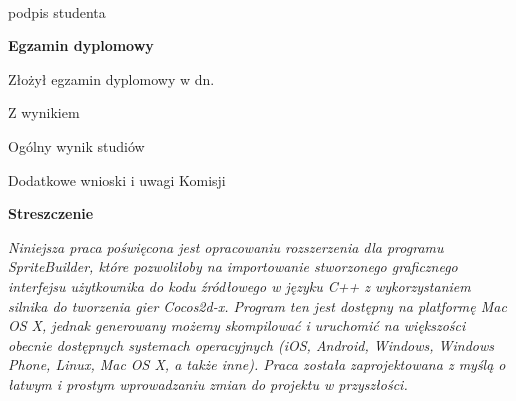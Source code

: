 \begin{titlepage}
    \par
    \vspace{2\baselineskip}
    \hfill\parbox{15em}{{\small\dotfill}\\[-.3ex]
    \centerline{\footnotesize podpis studenta}}\par
    \vspace{3\baselineskip}
    \begin{center}
 	{\large\bfseries Egzamin dyplomowy} \par\bigskip\bigskip
    \end{center}
    \par\noindent\vspace{1.5\baselineskip}
    Złożył egzamin dyplomowy w dn. \dotfill
    \par\noindent\vspace{1.5\baselineskip}
    Z wynikiem \dotfill
    \par\noindent\vspace{1.5\baselineskip}
    Ogólny wynik studiów \dotfill
    \par\noindent\vspace{1.5\baselineskip}
    Dodatkowe wnioski i uwagi Komisji \dotfill
    \par\noindent\vspace{1.5\baselineskip}
    \dotfill

    \newpage\thispagestyle{empty}
    \vspace*{2\baselineskip}
    \begin{center}
	{\large\bfseries Streszczenie}\par\bigskip
    \end{center}

    {\itshape
    Niniejsza praca poświęcona jest opracowaniu rozszerzenia dla programu SpriteBuilder, które pozwoliłoby na importowanie stworzonego graficznego interfejsu użytkownika do kodu źródłowego w języku C++ z wykorzystaniem silnika do tworzenia gier Cocos2d-x. Program ten jest dostępny na platformę Mac OS X, jednak generowany możemy skompilować i uruchomić na większości obecnie dostępnych systemach operacyjnych (iOS, Android, Windows, Windows Phone, Linux, Mac OS X, a także inne). Praca została zaprojektowana z myślą o łatwym i prostym wprowadzaniu zmian do projektu w przyszłości. }
    \vspace*{1\baselineskip}


\end{titlepage}
